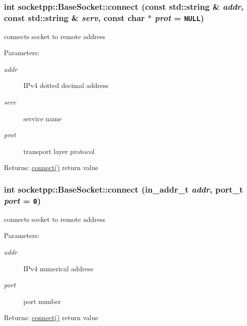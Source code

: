 \begin{CompactItemize}
{\subsubsection[{connect}]{\setlength{\rightskip}{0pt plus 5cm}int socketpp::BaseSocket::connect (const std::string \& {\em addr}, \/  const std::string \& {\em serv}, \/  const char $\ast$ {\em prot} = {\tt NULL})}}
\label{classsocketpp_1_1BaseSocket_eb0f4c84546c22fd9023169701d8fae8}


connects socket to remote address 

\begin{Desc}
\item[Parameters:]
\begin{description}
\item[{\em addr}]IPv4 dotted decimal address \item[{\em serv}]service name \item[{\em prot}]transport layer protocol \end{description}
\end{Desc}
\begin{Desc}
\item[Returns:]\hyperlink{classsocketpp_1_1BaseSocket_769710192256606aaec1a776468d75fa}{connect()} return value \end{Desc}
\hypertarget{classsocketpp_1_1BaseSocket_2bdd6d459e6f9cf2f71636b01787b250}{
\subsubsection[{connect}]{\setlength{\rightskip}{0pt plus 5cm}int socketpp::BaseSocket::connect (in\_\-addr\_\-t {\em addr}, \/  {\bf port\_\-t} {\em port} = {\tt 0})}}
\label{classsocketpp_1_1BaseSocket_2bdd6d459e6f9cf2f71636b01787b250}


connects socket to remote address 

\begin{Desc}
\item[Parameters:]
\begin{description}
\item[{\em addr}]IPv4 numerical address \item[{\em port}]port number \end{description}
\end{Desc}
\begin{Desc}
\item[Returns:]\hyperlink{classsocketpp_1_1BaseSocket_769710192256606aaec1a776468d75fa}{connect()} return value \end{Desc}
\hypertarget{classsocketpp_1_1BaseSocket_769710192256606aaec1a776468d75fa}{
}
\end{CompactItemize}
